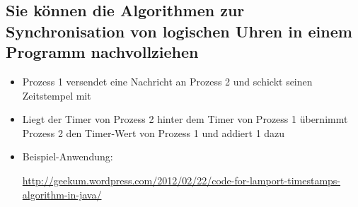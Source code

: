
\subsection{Sie können die Algorithmen zur Synchronisation von logischen Uhren in einem Programm nachvollziehen}

\begin{itemize}
	\item Prozess 1 versendet eine Nachricht an Prozess 2 und schickt seinen Zeitstempel mit
	\item Liegt der Timer von Prozess 2 hinter dem Timer von Prozess 1 übernimmt Prozess 2 den Timer-Wert von Prozess 1 und addiert 1 dazu
	\item Beispiel-Anwendung:
	
	\href{http://geekum.wordpress.com/2012/02/22/code-for-lamport-timestamps-algorithm-in-java/}{http://geekum.wordpress.com/2012/02/22/code-for-lamport-timestamps-algorithm-in-java/}
\end{itemize}
